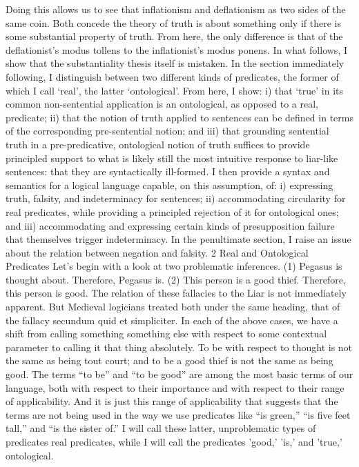\documentclass[]{article}
\begin{document}
Doing this allows us to see that inflationism and deflationism as two sides of the same coin. Both concede the theory of truth is about something only if there is some substantial property of truth. From here, the only difference is that of the deflationist’s modus tollens to the inflationist’s modus ponens. 
In what follows, I show that the substantiality thesis itself is mistaken. In the section immediately following, I distinguish between two different kinds of predicates, the former of which I call ‘real’, the latter ‘ontological’. From here, I show: i) that ‘true’ in its common non-sentential application is an ontological, as opposed to a real, predicate; ii) that the notion of truth applied to sentences can be defined in terms of the corresponding pre-sentential notion; and iii) that grounding sentential truth in a pre-predicative, ontological notion of truth suffices to provide principled support to what is likely still the most intuitive response to liar-like sentences: that they are syntactically ill-formed. I then provide a syntax and semantics for a logical language capable, on this assumption, of: i) expressing truth, falsity, and indeterminacy for sentences; ii) accommodating circularity for real predicates, while providing a principled rejection of it for ontological ones; and iii) accommodating and expressing certain kinds of presupposition failure that themselves trigger indeterminacy. In the penultimate section, I raise an issue about the relation between negation and falsity.
2 Real and Ontological Predicates
Let's begin with a look at two problematic inferences.
(1)	Pegasus is thought about. Therefore, Pegasus is.
(2)	This person is a good thief. Therefore, this person is good.
The relation of these fallacies to the Liar is not immediately apparent. But Medieval logicians treated both under the same heading, that of the fallacy secundum quid et simpliciter. In each of the above cases, we have a shift from calling something something else with respect to some contextual parameter to calling it that thing absolutely.  To be with respect to thought is not the same as being tout court; and to be a good thief is not the same as being good.
The terms “to be” and “to be good” are among the most basic terms of our language, both with respect to their importance and with respect to their range of applicability. And it is just this range of applicability that suggests that the terms are not being used in the way we use predicates like “is green,” “is five feet tall,” and “is the sister of.”  I will call these latter, unproblematic types of predicates real predicates, while I will call the predicates 'good,' 'is,' and 'true,' ontological. 
\end{document}
